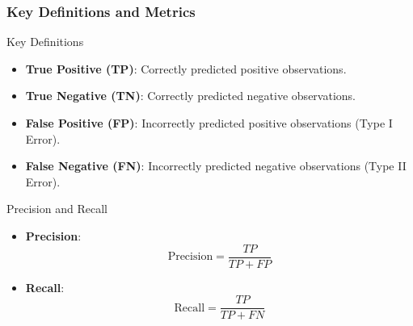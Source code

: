\documentclass{beamer}
\begin{document}
\begin{frame}[fragile]
    \frametitle{Key Definitions and Metrics}
    \begin{block}{Key Definitions}
        \begin{itemize}
            \item \textbf{True Positive (TP)}: Correctly predicted positive observations.
            \item \textbf{True Negative (TN)}: Correctly predicted negative observations.
            \item \textbf{False Positive (FP)}: Incorrectly predicted positive observations (Type I Error).
            \item \textbf{False Negative (FN)}: Incorrectly predicted negative observations (Type II Error).
        \end{itemize}
    \end{block}

    \begin{block}{Precision and Recall}
        \begin{itemize}
            \item \textbf{Precision}:
            \[
            \text{Precision} = \frac{TP}{TP + FP}
            \]
            \item \textbf{Recall}:
            \[
            \text{Recall} = \frac{TP}{TP + FN}
            \]
        \end{itemize}
    \end{block}
\end{frame}
\end{document}
